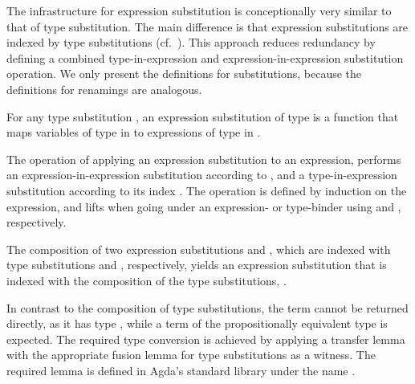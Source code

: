 \documentclass[acmsmall,anonymous,review,screen]{acmart}
\begin{document}
The infrastructure for expression substitution is conceptionally very similar to
that of type substitution.
The main difference is that expression substitutions are indexed by
type substitutions (cf.~\cite{DBLP:conf/mpc/ChapmanKNW19}).
This approach reduces redundancy by defining a combined type-in-expression and
expression-in-expression substitution operation.
We only present the definitions for substitutions, because
the definitions for renamings are analogous.

For any type substitution , an expression substitution of
type  is a function that maps variables of type  in
 to expressions of type  in .
\SubDefESub

The operation {\AEsub} of applying an expression substitution  to an expression,
performs an expression-in-expression substitution according to ,
and a type-in-expression substitution according to its index .
The operation is defined by induction on the expression, and lifts  when
going under an expression- or type-binder using {\AEliftS} and
{\AEliftSL}, respectively.
\SubDefEsub




The composition of two expression substitutions  and , which
are indexed with type substitutions  and
, respectively, yields an expression substitution that
is indexed with the composition of the type substitutions,
.
\SubstExamplesECompSS

In contrast to the composition of type substitutions, the term
 cannot be returned directly,
as it has type ,
while a term of the propositionally equivalent type
 is expected.
The required type conversion is achieved by applying a transfer lemma
with the appropriate fusion lemma for type substitutions as a witness. 
The required lemma is defined in Agda's standard library under the
name {\Asubst}.
\SubstExamplesDef
\end{document}
